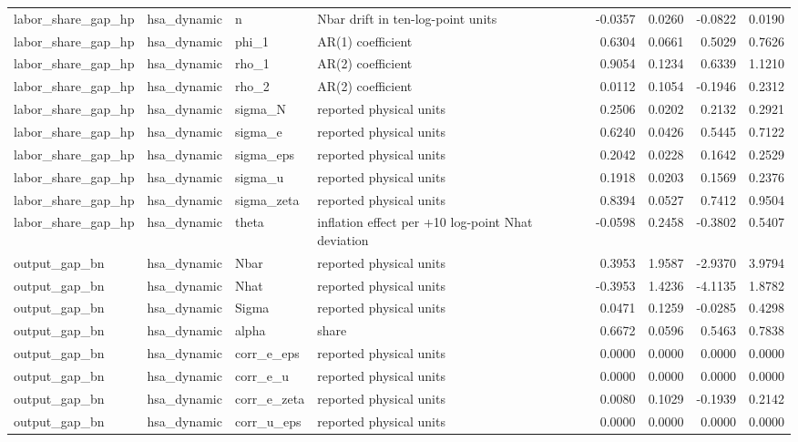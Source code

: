 \begin{tabular}{llllrrrr}
labor\_share\_gap\_hp & hsa\_dynamic & n & Nbar drift in ten-log-point units & -0.0357 & 0.0260 & -0.0822 & 0.0190 \\
labor\_share\_gap\_hp & hsa\_dynamic & phi\_1 & AR(1) coefficient & 0.6304 & 0.0661 & 0.5029 & 0.7626 \\
labor\_share\_gap\_hp & hsa\_dynamic & rho\_1 & AR(2) coefficient & 0.9054 & 0.1234 & 0.6339 & 1.1210 \\
labor\_share\_gap\_hp & hsa\_dynamic & rho\_2 & AR(2) coefficient & 0.0112 & 0.1054 & -0.1946 & 0.2312 \\
labor\_share\_gap\_hp & hsa\_dynamic & sigma\_N & reported physical units & 0.2506 & 0.0202 & 0.2132 & 0.2921 \\
labor\_share\_gap\_hp & hsa\_dynamic & sigma\_e & reported physical units & 0.6240 & 0.0426 & 0.5445 & 0.7122 \\
labor\_share\_gap\_hp & hsa\_dynamic & sigma\_eps & reported physical units & 0.2042 & 0.0228 & 0.1642 & 0.2529 \\
labor\_share\_gap\_hp & hsa\_dynamic & sigma\_u & reported physical units & 0.1918 & 0.0203 & 0.1569 & 0.2376 \\
labor\_share\_gap\_hp & hsa\_dynamic & sigma\_zeta & reported physical units & 0.8394 & 0.0527 & 0.7412 & 0.9504 \\
labor\_share\_gap\_hp & hsa\_dynamic & theta & inflation effect per +10 log-point Nhat deviation & -0.0598 & 0.2458 & -0.3802 & 0.5407 \\
output\_gap\_bn & hsa\_dynamic & Nbar & reported physical units & 0.3953 & 1.9587 & -2.9370 & 3.9794 \\
output\_gap\_bn & hsa\_dynamic & Nhat & reported physical units & -0.3953 & 1.4236 & -4.1135 & 1.8782 \\
output\_gap\_bn & hsa\_dynamic & Sigma & reported physical units & 0.0471 & 0.1259 & -0.0285 & 0.4298 \\
output\_gap\_bn & hsa\_dynamic & alpha & share & 0.6672 & 0.0596 & 0.5463 & 0.7838 \\
output\_gap\_bn & hsa\_dynamic & corr\_e\_eps & reported physical units & 0.0000 & 0.0000 & 0.0000 & 0.0000 \\
output\_gap\_bn & hsa\_dynamic & corr\_e\_u & reported physical units & 0.0000 & 0.0000 & 0.0000 & 0.0000 \\
output\_gap\_bn & hsa\_dynamic & corr\_e\_zeta & reported physical units & 0.0080 & 0.1029 & -0.1939 & 0.2142 \\
output\_gap\_bn & hsa\_dynamic & corr\_u\_eps & reported physical units & 0.0000 & 0.0000 & 0.0000 & 0.0000 \\

\end{tabular}
